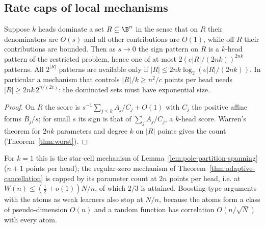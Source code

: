 \subsection{Rate caps of local mechanisms}
\begin{proposition}
\label{prop:wn-local-cap}
Suppose $k$ heads dominate a set $R\subseteq\B^n$ in the sense that on
$R$ their denominators are $O(s)$ and all other contributions are
$O(1)$, while off $R$ their contributions are bounded. Then as $s\to0$
the sign pattern on $R$ is a $k$-head pattern of the restricted problem,
hence one of at most $2(e|R|/(2nk))^{2nk}$ patterns. All $2^{|R|}$
patterns are available only if $|R|\le2nk\log_2(e|R|/(2nk))$. In
particular a mechanism that controls $|R|/k\ge n^2/c$ points per head
needs $|R|\ge2nk\,2^{n/(2c)}$: the dominated sets must have exponential
size.
\end{proposition}
\begin{proof}
On $R$ the score is $s^{-1}\sum_{j\le k}A_j/C_j+O(1)$ with $C_j$ the
positive affine forms $B_j/s$; for small $s$ its sign is that of
$\sum_jA_j/C_j$, a $k$-head score. Warren's theorem for $2nk$ parameters
and degree $k$ on $|R|$ points gives the count (Theorem~\ref{thm:worst}).
\end{proof}

For $k=1$ this is the star-cell mechanism of
Lemma~\ref{lem:pole-partition-spanning} ($n+1$ points per head); the
regular-zero mechanism of Theorem~\ref{thm:adaptive-cancellation} is
capped by its parameter count at $2n$ points per head, i.e. at
$W(n)\le(\tfrac12+o(1))N/n$, of which $2/3$ is attained. Boosting-type
arguments with the atoms as weak learners also stop at $N/n$, because
the atoms form a class of pseudo-dimension $O(n)$ and a random
function has correlation $O(n/\sqrt N)$ with every atom.



